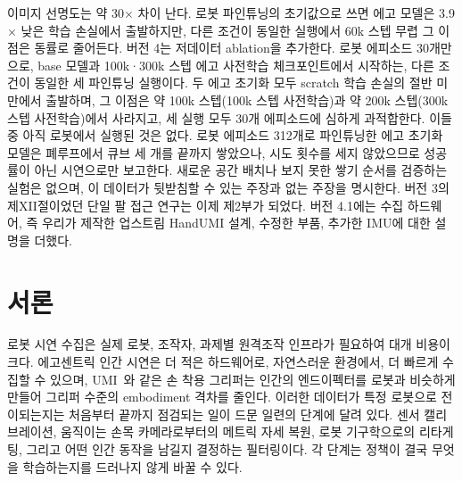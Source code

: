 \documentclass[conference,10pt]{IEEEtran}
\begin{document}
{이미지 선명도는 약 30$\times$ 차이 난다. 로봇 파인튜닝의 초기값으로 쓰면 에고 모델은 3.9$\times$ 낮은 학습 손실에서 출발하지만,
다른 조건이 동일한 실행에서 60k 스텝 무렵 그 이점은 동률로 줄어든다. 버전 4는 저데이터 ablation을 추가한다. 로봇 에피소드 30개만으로,
base 모델과 100k·300k 스텝 에고 사전학습 체크포인트에서 시작하는, 다른 조건이 동일한 세 파인튜닝 실행이다. 두 에고 초기화 모두
scratch 학습 손실의 절반 미만에서 출발하며, 그 이점은 약 100k 스텝(100k 스텝 사전학습)과 약 200k 스텝(300k 스텝 사전학습)에서
사라지고, 세 실행 모두 30개 에피소드에 심하게 과적합한다. 이들 중 아직 로봇에서 실행된 것은 없다. 로봇 에피소드 312개로 파인튜닝한
에고 초기화 모델은 폐루프에서 큐브 세 개를 끝까지 쌓았으나, 시도 횟수를 세지 않았으므로 성공률이 아닌 시연으로만 보고한다. 새로운
공간 배치나 보지 못한 쌓기 순서를 검증하는 실험은 없으며, 이 데이터가 뒷받침할 수 있는 주장과 없는 주장을 명시한다. 버전 3의
제XII절이었던 단일 팔 접근 연구는 이제 제2부가 되었다. 버전 4.1에는 수집 하드웨어, 즉 우리가 제작한
업스트림 HandUMI 설계, 수정한 부품, 추가한 IMU에 대한 설명을 더했다.}
\section{서론}\label{p1:sec:intro}
로봇 시연 수집은 실제 로봇, 조작자, 과제별 원격조작 인프라가 필요하여 대개 비용이 크다. 에고센트릭 인간 시연은 더 적은 하드웨어로,
자연스러운 환경에서, 더 빠르게 수집할 수 있으며, UMI~\cite{chi2024umi}와 같은 손 착용 그리퍼는 인간의 엔드이펙터를 로봇과 비슷하게
만들어 그리퍼 수준의 embodiment 격차를 줄인다. 이러한 데이터가 특정 로봇으로 전이되는지는 처음부터 끝까지 점검되는 일이 드문
일련의 단계에 달려 있다. 센서 캘리브레이션, 움직이는 손목 카메라로부터의 메트릭 자세 복원, 로봇 기구학으로의 리타게팅, 그리고
어떤 인간 동작을 남길지 결정하는 필터링이다. 각 단계는 정책이 결국 무엇을 학습하는지를 드러나지 않게 바꿀 수 있다.
\end{document}

